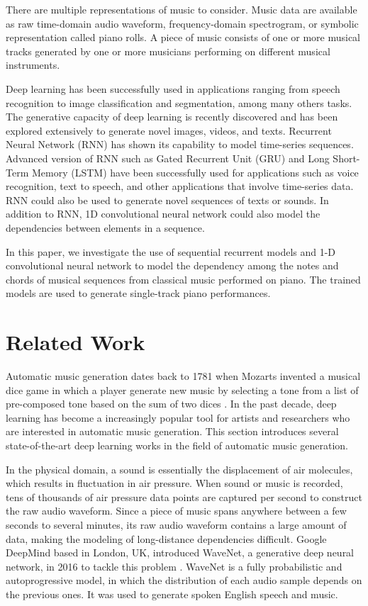 \documentclass[sigconf,authorversion]{acmart}
\begin{document}
There are multiple representations of music to consider. Music data are available
as raw time-domain audio waveform, frequency-domain spectrogram, or symbolic
representation called piano rolls. A piece of music consists of one or more musical
tracks generated by one or more musicians performing on different musical
instruments.

Deep learning has been successfully used in applications ranging from speech
recognition to image classification and segmentation, among many others tasks.
The generative capacity of deep learning is recently discovered and has been
explored extensively to generate novel images, videos, and texts.
Recurrent Neural Network (RNN) has shown its capability to
model time-series sequences. Advanced version of RNN such as Gated Recurrent 
Unit (GRU) and Long Short-Term Memory (LSTM) have been successfully used for 
applications such as voice recognition, text to speech, and other applications 
that involve time-series data. RNN could also be used to generate novel 
sequences of texts or sounds. In addition to RNN, 1D convolutional neural network
could also model the dependencies between elements in a sequence.

In this paper, we investigate the use of sequential recurrent models and 1-D 
convolutional neural network to model the dependency among the notes and chords
of musical sequences from classical music performed on piano. The trained models 
are used to generate single-track piano performances.

\section{Related Work}

Automatic music generation dates back to 1781 when Mozarts invented 
a musical dice game in which a player generate new music by selecting
a tone from a list of pre-composed tone based on the sum of two dices 
\cite{enwiki:995309040}. In the past decade, deep learning has become
a increasingly popular tool for artists and researchers who are interested in automatic 
music generation. This section introduces several state-of-the-art deep learning 
works in the field of automatic music generation.

In the physical domain, a sound is essentially the displacement of air molecules,
which results in fluctuation in air pressure. When sound or music is recorded,
tens of thousands of air pressure data points are captured per second to
construct the raw audio waveform. Since a piece of music spans anywhere between 
a few seconds to several minutes, its raw audio waveform contains a large amount
of data, making the modeling of long-distance dependencies difficult. Google DeepMind
based in London, UK, introduced WaveNet, a generative deep neural network, in 2016
to tackle this problem \cite{oord_wavenet_2016}. WaveNet is a fully probabilistic
and autoprogressive model, in which the distribution of each audio sample depends on 
the previous ones. It was used to generate spoken English speech and music.
\end{document}
